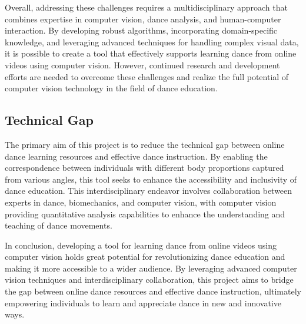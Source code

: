 Overall, addressing these challenges requires a multidisciplinary approach that combines expertise 
in computer vision, dance analysis, and human-computer interaction. By developing robust algorithms, 
incorporating domain-specific knowledge, and leveraging advanced techniques for handling complex 
visual data, it is possible to create a tool that effectively supports learning dance from online 
videos using computer vision. However, continued research and development efforts are needed to 
overcome these challenges and realize the full potential of computer vision technology in the 
field of dance education.\cite{Authors14b}

\subsection{Technical Gap}
The primary aim of this project is to reduce the technical gap between online dance learning resources and 
effective dance instruction. By enabling the correspondence between individuals with different body proportions 
captured from various angles, this tool seeks to enhance the accessibility and inclusivity of dance education. 
This interdisciplinary endeavor involves collaboration between experts in dance, biomechanics, and computer 
vision, with computer vision providing quantitative analysis capabilities to enhance the understanding and 
teaching of dance movements.

In conclusion, developing a tool for learning dance from online videos using computer vision holds 
great potential for revolutionizing dance education and making it more accessible to a wider 
audience. By leveraging advanced computer vision techniques and interdisciplinary collaboration, 
this project aims to bridge the gap between online dance resources and effective dance instruction, 
ultimately empowering individuals to learn and appreciate dance in new and innovative ways.



